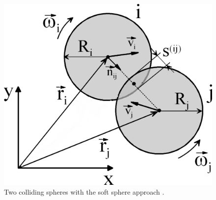 \begin{figure}[!h]
\centering
\includegraphics[width=.6\columnwidth]{images/109twospheres}
\caption[Two spheres]{Two colliding spheres with the soft sphere approach
\cite{RefWorks:201}.}
\label{fig:109twospheres}
\end{figure}
